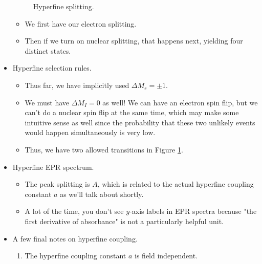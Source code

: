 \documentclass[../notes.tex]{subfiles}
\begin{document}
\begin{itemize}
\begin{figure}[h!]
        \caption{Hyperfine splitting.}
        \label{fig:hyperfineSplitting}
    \end{figure}
    \begin{itemize}
        \item We first have our electron splitting.
        \item Then if we turn on nuclear splitting, that happens next, yielding four distinct states.
    \end{itemize}
    \item Hyperfine selection rules.
    \begin{itemize}
        \item Thus far, we have implicitly used $\Delta M_s=\pm 1$.
        \item We must have $\Delta M_I=0$ as well! We can have an electron spin flip, but we can't do a nuclear spin flip at the same time, which may make some intuitive sense as well since the probability that these two unlikely events would happen simultaneously is very low.
        \item Thus, we have two allowed transitions in Figure \ref{fig:hyperfineSplitting}.
    \end{itemize}
    \item Hyperfine EPR spectrum.
    \begin{itemize}
        \item The peak splitting is $A$, which is related to the actual hyperfine coupling constant $a$ as we'll talk about shortly.
        \item A lot of the time, you don't see $y$-axis labels in EPR spectra because "the first derivative of absorbance" is not a particularly helpful unit.
    \end{itemize}
    \item A few final notes on hyperfine coupling.
    \begin{enumerate}
        \item The hyperfine coupling constant $a$ is field independent.

\end{enumerate}
\end{itemize}
\end{document}

